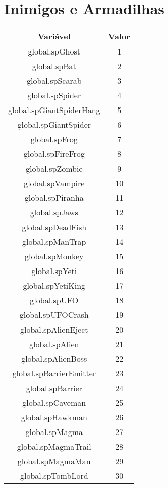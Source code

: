 \section{Inimigos e Armadilhas}

\begin{center}
    \begin{tabular}{ |c|c| }
        \hline
        \textbf{Variável} & \textbf{Valor} \\ \hline
        global.spGhost & 1 \\ \hline
        global.spBat & 2 \\ \hline
        global.spScarab & 3 \\ \hline
        global.spSpider & 4 \\ \hline
        global.spGiantSpiderHang & 5 \\ \hline
        global.spGiantSpider & 6 \\ \hline
        global.spFrog & 7 \\ \hline
        global.spFireFrog & 8 \\ \hline
        global.spZombie & 9 \\ \hline
        global.spVampire & 10 \\ \hline
        global.spPiranha & 11 \\ \hline
        global.spJaws & 12 \\ \hline
        global.spDeadFish & 13 \\ \hline
        global.spManTrap & 14 \\ \hline
        global.spMonkey & 15 \\ \hline
        global.spYeti & 16 \\ \hline
        global.spYetiKing & 17 \\ \hline
        global.spUFO & 18 \\ \hline
        global.spUFOCrash & 19 \\ \hline
        global.spAlienEject & 20 \\ \hline
        global.spAlien & 21 \\ \hline
        global.spAlienBoss & 22 \\ \hline
        global.spBarrierEmitter & 23 \\ \hline
        global.spBarrier & 24 \\ \hline
        global.spCaveman & 25 \\ \hline
        global.spHawkman & 26 \\ \hline
        global.spMagma & 27 \\ \hline
        global.spMagmaTrail & 28 \\ \hline
        global.spMagmaMan & 29 \\ \hline
        global.spTombLord & 30 \\ \hline
    \end{tabular}
\end{center}

